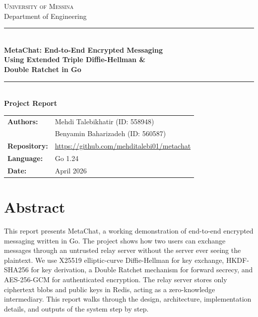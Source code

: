 \documentclass[12pt,a4paper]{article}
\begin{document}
\begin{titlepage}
\centering
\vspace*{1cm}
{\Large\textsc{University of Messina}}\\[0.3cm]
{\large Department of Engineering}\\[2cm]
\rule{\linewidth}{0.5mm}\\[0.5cm]
{\LARGE\bfseries MetaChat: End-to-End Encrypted Messaging\\[0.3cm]
Using Extended Triple Diffie-Hellman \&\\Double Ratchet in Go}\\[0.5cm]
\rule{\linewidth}{0.5mm}\\[2cm]
{\large\textbf{Project Report}}\\[2cm]
\begin{tabular}{l l}
\textbf{Authors:} & Mehdi Talebikhatir \quad (ID: 558948) \\
                   & Benyamin Baharizadeh \quad (ID: 560587) \\[1cm]
\textbf{Repository:} & \url{https://github.com/mehditalebi01/metachat} \\[0.5cm]
\textbf{Language:} & Go 1.24 \\
\textbf{Date:} & April 2026 \\
\end{tabular}
\vfill
\end{titlepage}

\tableofcontents
\newpage

\section{Abstract}

This report presents MetaChat, a working demonstration of end-to-end encrypted messaging written in Go. The project shows how two users can exchange messages through an untrusted relay server without the server ever seeing the plaintext. We use X25519 elliptic-curve Diffie-Hellman for key exchange, HKDF-SHA256 for key derivation, a Double Ratchet mechanism for forward secrecy, and AES-256-GCM for authenticated encryption. The relay server stores only ciphertext blobs and public keys in Redis, acting as a zero-knowledge intermediary. This report walks through the design, architecture, implementation details, and outputs of the system step by step.
\end{document}
